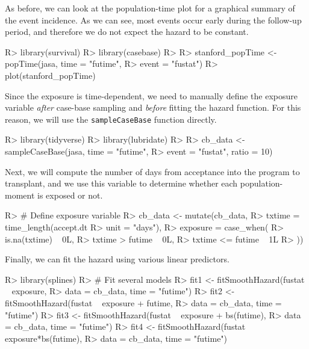 \documentclass[
]{jss}
\begin{document}
As before, we can look at the population-time plot for a graphical
summary of the event incidence. As we can see, most events occur early
during the follow-up period, and therefore we do not expect the hazard
to be constant.

\begin{CodeChunk}

\begin{CodeInput}
R> library(survival)
R> library(casebase)
R> 
R> stanford_popTime <- popTime(jasa, time = "futime", 
R>                             event = "fustat")
R> plot(stanford_popTime)
\end{CodeInput}
\end{CodeChunk}

Since the exposure is time-dependent, we need to manually define the
exposure variable \emph{after} case-base sampling and \emph{before}
fitting the hazard function. For this reason, we will use the
\texttt{sampleCaseBase} function directly.

\begin{CodeChunk}

\begin{CodeInput}
R> library(tidyverse)
R> library(lubridate)
R> 
R> cb_data <- sampleCaseBase(jasa, time = "futime", 
R>                           event = "fustat", ratio = 10)
\end{CodeInput}
\end{CodeChunk}

Next, we will compute the number of days from acceptance into the
program to transplant, and we use this variable to determine whether
each population-moment is exposed or not.

\begin{CodeChunk}

\begin{CodeInput}
R> # Define exposure variable
R> cb_data <- mutate(cb_data,
R>                   txtime = time_length(accept.dt %
R>                                        unit = "days"),
R>                   exposure = case_when(
R>                     is.na(txtime) ~ 0L,
R>                     txtime > futime ~ 0L,
R>                     txtime <= futime ~ 1L
R>                   ))
\end{CodeInput}
\end{CodeChunk}

Finally, we can fit the hazard using various linear predictors.

\begin{CodeChunk}

\begin{CodeInput}
R> library(splines)
R> # Fit several models
R> fit1 <- fitSmoothHazard(fustat ~ exposure,
R>                         data = cb_data, time = "futime")
R> fit2 <- fitSmoothHazard(fustat ~ exposure + futime,
R>                         data = cb_data, time = "futime")
R> fit3 <- fitSmoothHazard(fustat ~ exposure + bs(futime),
R>                         data = cb_data, time = "futime")
R> fit4 <- fitSmoothHazard(fustat ~ exposure*bs(futime),
R>                         data = cb_data, time = "futime")
\end{CodeInput}
\end{CodeChunk}
\end{document}
